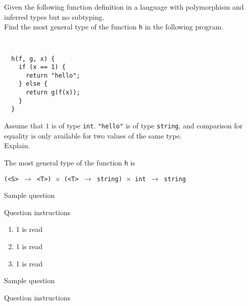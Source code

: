 \documentclass[11pt]{exam}
\begin{document}
\begin{questions}

      \question Given the following function definition in a language
        with polymorphism and inferred types but no subtyping.\\
        Find the most general type of the function {\tt h} in the following program.
        {\tt
\begin{lstlisting}
  h(f, g, x) {
    if (x == 1) {
      return "hello";
    } else {
      return g(f(x));
    }
  }
\end{lstlisting}
        }
        Assume that $1$ is of type {\tt int}. {\tt "hello"} is of type {\tt string},
        and comparison for equality is only available for two values of the same type. \\
        Explain.

	\begin{framed}

            The most general type of the function {\tt h} is 
            
            {\tt (<S> $\to$ <T>) $\times$ (<T> $\to$ string) $\times$ int $\to$ string}

	\end{framed}


	\question Sample question

	Question instructions

	\begin{framed}


	\end{framed}

        \begin{enumerate}[label=(\roman*)]
            \item 1 is read
                \begin{framed}
                \end{framed}
            \item 1 is read
                \begin{framed}
                \end{framed}
            \item 1 is read
                \begin{framed}
                \end{framed}
        \end{enumerate}


	\question Sample question


	\quad

	Question instructions

	\begin{framed}

	\end{framed}

\end{questions}
\end{document}
